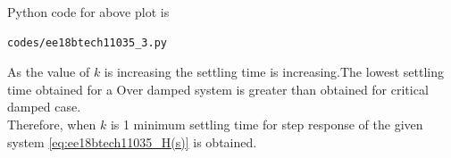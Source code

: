 \begin{enumerate}[label=\thesubsection.\arabic*.,ref=\thesubsection.\theenumi]
Python code for above plot is
\begin{lstlisting}
codes/ee18btech11035_3.py
\end{lstlisting}
As the value of $k$ is increasing the settling time is increasing.The lowest settling time obtained for a Over
damped system is greater than obtained for critical damped case.\\
Therefore, when $k$ is 1 minimum settling time for step response of the given system \eqref{eq:ee18btech11035_H(s)} is obtained.
\end{enumerate}
